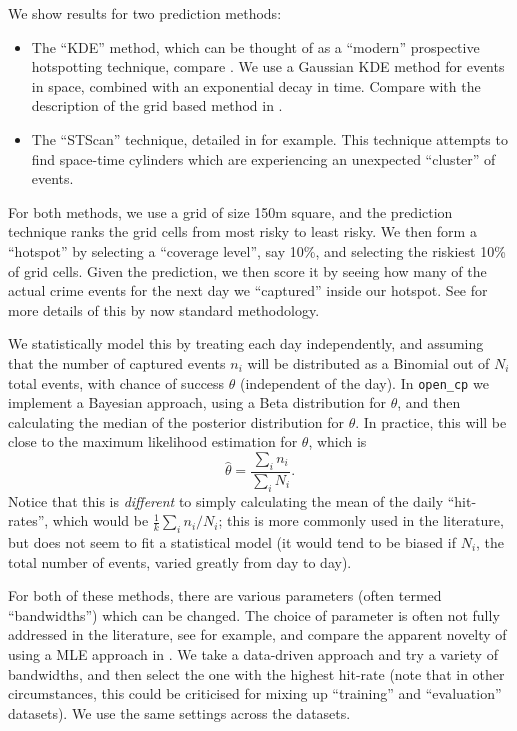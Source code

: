 \documentclass[twoside,a4paper,twocolumn,10pt]{article}
\theoremstyle{plain}
\theoremstyle{definition}
\begin{document}
We show results for two prediction methods:
\begin{itemize}
\item The ``KDE'' method, which can be thought of as a ``modern'' prospective hotspotting
technique, compare \cite{bjp}.  We use a Gaussian KDE method for events in space, combined
with an exponential decay in time.  Compare with the description of the grid based method
in \cite{rosser_nw}.
\item The ``STScan'' technique, detailed in \cite{arc} for example.  This technique attempts
to find space-time cylinders which are experiencing an unexpected ``cluster'' of events.
\end{itemize}
For both methods, we use a grid of size 150m square, and the prediction technique ranks the
grid cells from most risky to least risky.  We then form a ``hotspot'' by selecting a
``coverage level'', say 10\%, and selecting the riskiest 10\% of grid cells.  Given the prediction,
we then score it by seeing how many of the actual crime events for the next day we ``captured''
inside our hotspot.  See \cite{arc, bjp} for more details of this by now standard methodology.

We statistically model this by treating each day independently, and assuming that the number of
captured events $n_i$ will be distributed as a Binomial out of $N_i$ total events, with chance
of success $\theta$ (independent of the day).  In \texttt{open\_cp} we implement a Bayesian
approach, using a Beta distribution for $\theta$, and then calculating the median of the posterior
distribution for $\theta$.  In practice, this will be close to the maximum likelihood estimation
for $\theta$, which is
\[ \hat\theta = \frac{\sum_i n_i}{\sum_i N_i}. \]
Notice that this is \emph{different} to simply calculating the mean of the daily ``hit-rates'',
which would be $\frac1k \sum_i n_i / N_i$; this is more commonly used in the literature, but
does not seem to fit a statistical model (it would tend to be biased if $N_i$, the total
number of events, varied greatly from day to day).

For both of these methods, there are various parameters (often termed ``bandwidths'') which can
be changed.  The choice of parameter is often not fully addressed in the literature, see
\cite{arc} for example, and compare the apparent novelty of using a MLE approach in
\cite{rosser_nw}.  We take a data-driven approach and try a variety of bandwidths, and
then select the one with the highest hit-rate (note that in other circumstances, this
could be criticised for mixing up ``training'' and ``evaluation'' datasets).  We use the same
settings across the datasets.
\end{document}

